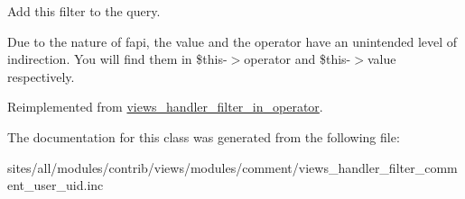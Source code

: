 Add this filter to the query.

Due to the nature of fapi, the value and the operator have an unintended level of indirection. You will find them in \$this-$>$operator and \$this-$>$value respectively. 

Reimplemented from \hyperlink{classviews__handler__filter__in__operator_f4b9a596ad1e6fbee116977ca0a7d8a9}{views\_\-handler\_\-filter\_\-in\_\-operator}.

The documentation for this class was generated from the following file:\begin{CompactItemize}
\item 
sites/all/modules/contrib/views/modules/comment/views\_\-handler\_\-filter\_\-comment\_\-user\_\-uid.inc\end{CompactItemize}

